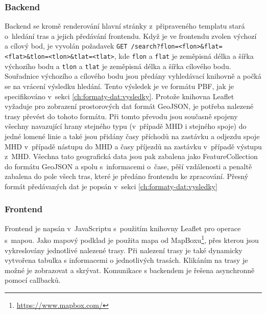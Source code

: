 \subsubsection{Backend}
Backend se kromě renderování hlavní stránky z~připraveného templatu stará
o~hledání tras a jejich předávání frontendu. Když je ve frontendu zvolen výchozí a
cílový bod, je vyvolán požadavek {\tt GET
/search?flon=<flon>\&flat=<flat>\&tlon=<tlon>\&tlat=<tlat>}, kde {\tt flon} a
{\tt flat} je zeměpisná délka a šířka výchozího bodu a {\tt tlon} a {\tt tlat}
je zeměpisná délka a šířka cílového bodu. Souřadnice výchozího a cílového bodu
jsou předány vyhledávací knihovně a počká se na vrácení výsledku hledání. Tento
výsledek je ve formátu PBF, jak je specifikováno v~sekci \ref{ch:formaty-dat:vysledky}.
Protože knihovna Leaflet vyžaduje pro zobrazení prostorových dat formát
GeoJSON\cite{GeoJSON}, je potřeba nalezené trasy převést do tohoto formátu. Při
tomto převodu jsou současně spojeny všechny navazující hrany stejného typu
(v~případě MHD i stejného spoje) do jedné lomené linie a také jsou přidány časy
příchodů na zastávku a odjezdu spoje MHD v~případě nástupu do MHD a časy
příjezdů na zastávku v~případě výstupu z~MHD. Všechna tato geografická data jsou
pak zabalena jako FeatureCollection do formátu GeoJSON a spolu s~informacemi
o~čase, pěší vzdálenosti a penaltě zabalena do pole všech tras, které je předáno
frontendu ke zpracování. Přesný formát předávaných dat je popsán v~sekci \ref{ch:formaty-dat:vysledky}
\subsubsection{Frontend}
Frontend je napsán v~JavaScriptu s~použitím knihovny Leaflet pro operace
s~mapou. Jako mapový podklad je použita mapa od
MapBoxu\footnote{\url{https://www.mapbox.com/}}, přes kterou
jsou vykreslovány jednotlivé nalezené trasy. Při nalezení trasy je také
dynamicky vytvořena tabulka s informacemi o jednotlivých trasách. Klikáním na
trasy je možné je zobrazovat a skrývat. Komunikace s backendem je řešena
asynchronně pomocí callbacků.
